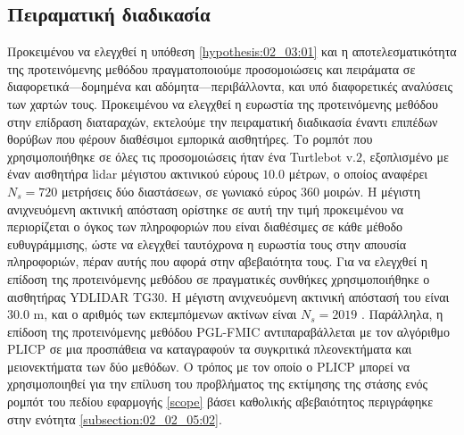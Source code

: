 \subsection{Πειραματική διαδικασία}
\label{subsection:02_03_04:01}

Προκειμένου να ελεγχθεί η υπόθεση \ref{hypothesis:02_03:01} και η
αποτελεσματικότητα της προτεινόμενης μεθόδου πραγματοποιούμε προσομοιώσεις και
πειράματα σε διαφορετικά---δομημένα και αδόμητα---περιβάλλοντα, και υπό
διαφορετικές αναλύσεις των χαρτών τους.  Προκειμένου να ελεγχθεί η ευρωστία της
προτεινόμενης μεθόδου στην επίδραση διαταραχών, εκτελούμε την πειραματική
διαδικασία έναντι επιπέδων θορύβων που φέρουν διαθέσιμοι εμπορικά αισθητήρες.
Το ρομπότ που χρησιμοποιήθηκε σε όλες τις προσομοιώσεις ήταν ένα Turtlebot
v.$2$, εξοπλισμένο με έναν αισθητήρα lidar μέγιστου ακτινικού εύρους $10.0$
μέτρων, ο οποίος αναφέρει $N_s=720$ μετρήσεις δύο διαστάσεων, σε γωνιακό εύρος
$360$ μοιρών. Η μέγιστη ανιχνευόμενη ακτινική απόσταση ορίστηκε σε αυτή την
τιμή προκειμένου να περιορίζεται ο όγκος των πληροφοριών που είναι διαθέσιμες
σε κάθε μέθοδο ευθυγράμμισης, ώστε να ελεγχθεί ταυτόχρονα η ευρωστία τους στην
απουσία πληροφοριών, πέραν αυτής που αφορά στην αβεβαιότητα τους. Για να
ελεγχθεί η επίδοση της προτεινόμενης μεθόδου σε πραγματικές συνθήκες
χρησιμοποιήθηκε ο αισθητήρας YDLIDAR TG30. Η μέγιστη ανιχνευόμενη ακτινική
απόστασή του είναι $30.0$ m, και ο αριθμός των εκπεμπόμενων ακτίνων είναι $N_s
= 2019$ \cite{ydlidar}. Παράλληλα, η επίδοση της προτεινόμενης μεθόδου PGL-FMIC
αντιπαραβάλλεται με τον αλγόριθμο PLICP σε μια προσπάθεια να καταγραφούν τα
συγκριτικά πλεονεκτήματα και μειονεκτήματα των δύο μεθόδων. Ο τρόπος με τον
οποίο ο PLICP μπορεί να χρησιμοποιηθεί για την επίλυση του προβλήματος της
εκτίμησης της στάσης ενός ρομπότ του πεδίου εφαρμογής \ref{scope} βάσει
καθολικής αβεβαιότητος περιγράφηκε στην ενότητα \ref{subsection:02_02_05:02}.

